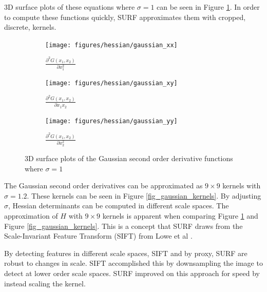 \documentclass[sigconf]{acmart/acmart}
\begin{document}
3D surface plots of these equations where $\sigma=1$ can be seen in Figure \ref{fig_gaussian_surface_plots}. In order to compute these functions quickly, SURF approximates them with cropped, discrete, kernels. 

\begin{figure}[h]
	\centering
	\begin{subfigure}[b]{0.45\textwidth}
		\centering
		\texttt{[image: figures/hessian/gaussian\_xx]}
		\caption{$\frac{\partial^2 G(x_1, x_2)}{\partial x_1^2}$}
	\end{subfigure}
	\begin{subfigure}[b]{0.45\textwidth}
		\centering
		\texttt{[image: figures/hessian/gaussian\_xy]}
		\caption{$\frac{\partial^2 G(x_1, x_2)}{\partial x_1 x_2}$}
	\end{subfigure}
	\begin{subfigure}[b]{0.45\textwidth}
		\centering
		\texttt{[image: figures/hessian/gaussian\_yy]}
		\caption{$\frac{\partial^2 G(x_1, x_2)}{\partial x_2^2}$}
	\end{subfigure}
	\caption{3D surface plots of the Gaussian second order derivative functions where $\sigma=1$}
	\label{fig_gaussian_surface_plots}
\end{figure}

The Gaussian second order derivatives can be approximated as $9 \times 9$ kernels with $\sigma=1.2$. These kernels can be seen in Figure \ref{fig_gaussian_kernels}. By adjusting $\sigma$, Hessian determinants can be computed in different scale spaces. The approximation of $H$ with $9 \times 9$ kernels is apparent when comparing Figure \ref{fig_gaussian_surface_plots} and Figure \ref{fig_gaussian_kernels}. This is a concept that SURF draws from the Scale-Invariant Feature Transform (SIFT) from Lowe et al \cite{lowe_distinctive_2004}.

 By detecting features in different scale spaces, SIFT and by proxy, SURF are robust to changes in scale. SIFT accomplished this by downsampling the image to detect at lower order scale spaces. SURF improved on this approach for speed by instead scaling the kernel.
\end{document}
